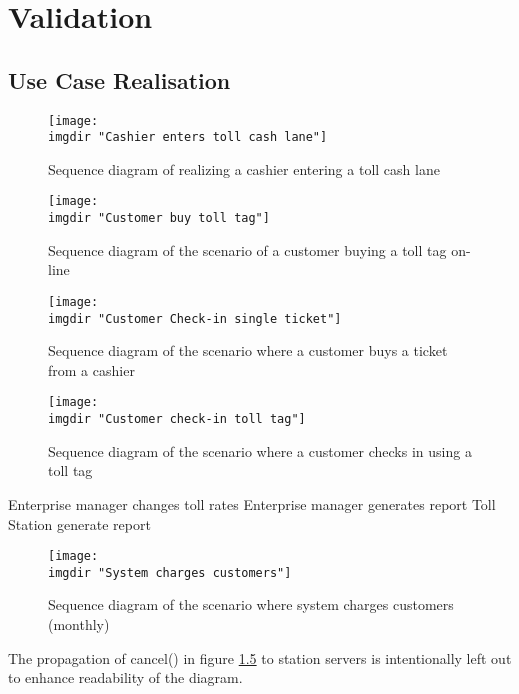 \chapter{Validation}
\section{Use Case Realisation}


\begin{figure}
  \texttt{[image: \\imgdir "Cashier enters toll cash lane"]}
  \caption{Sequence diagram of realizing a cashier entering a toll cash lane}
  \label{fig:seq_diag:system_charges_customers}
\end{figure}

\begin{figure}
  \texttt{[image: \\imgdir "Customer buy toll tag"]}
  \caption{Sequence diagram of the scenario of a customer buying a toll tag on-line}
  \label{fig:seq_diag:customer_orders_toll_tag_online}
\end{figure}

\begin{figure}
  \texttt{[image: \\imgdir "Customer Check-in single ticket"]}
  \caption{Sequence diagram of the scenario where a customer buys a ticket from a cashier}
  \label{fig:seq_diag:customer_check_in_single_ticket}
\end{figure}

\begin{figure}
  \texttt{[image: \\imgdir "Customer check-in toll tag"]}
  \caption{Sequence diagram of the scenario where a customer checks in using a toll tag}
  \label{fig:seq_diag:customer_check_in_toll_tag}
\end{figure}

Enterprise manager changes toll rates
Enterprise manager generates report
Toll Station generate report

\begin{figure}
  \texttt{[image: \\imgdir "System charges customers"]}
  \caption{Sequence diagram of the scenario where system charges customers (monthly)}
  \label{fig:seq_diag:system_charges_customers}
\end{figure}
The propagation of cancel() in figure \ref{fig:seq_diag:system_charges_customers} to station servers is intentionally left out to enhance readability of the diagram.